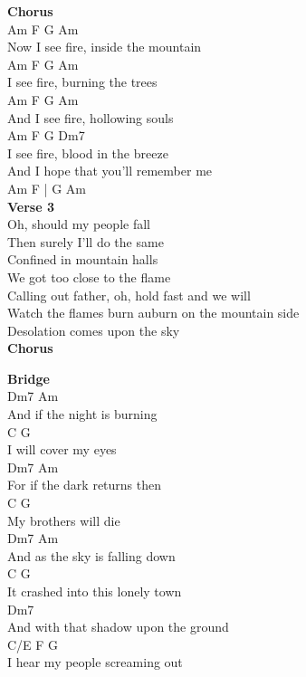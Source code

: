 \documentclass[a4paper]{article}
\begin{document}
{{        }
        \textbf{Chorus}
        ~\\
        {
            \cutive
            \obeyspaces
          Am  F  G          Am
\\
Now I see fire,  inside the mountain
\\
      Am  F  G           Am
\\
I see fire,  burning the trees
\\
          Am  F  G         Am
\\
And I see fire,  hollowing souls
\\
      Am  F  G            Dm7
\\
I see fire,  blood in the breeze
\\
And I hope that you'll remember me
\\
Am F | G Am
\\

        }
        \textbf{Verse 3}
        ~\\
        {
            \cutive
            \obeyspaces
Oh, should my people fall
\\
Then surely I'll do the same
\\
Confined in mountain halls
\\
We got too close to the flame
\\
Calling out father, oh, hold fast and we will
\\
Watch the flames burn auburn on the mountain side
\\
Desolation comes upon the sky
\\

        }
        \textbf{Chorus}
        ~\\
        {
            \cutive
            \obeyspaces

        }
        \textbf{Bridge}
        ~\\
        {
            \cutive
            \obeyspaces
           Dm7      Am
\\
And if the night is burning
\\
       C        G
\\
I will cover my eyes
\\
           Dm7    Am
\\
For if the dark returns then
\\
   C             G
\\
My brothers will die
\\
           Dm7            Am
\\
And as the sky is falling down
\\
           C                G
\\
It crashed into this lonely town
\\
              Dm7
\\
And with that shadow upon the ground
\\
  C/E     F                G
\\
I hear my people screaming out
\\

}}
\end{document}
